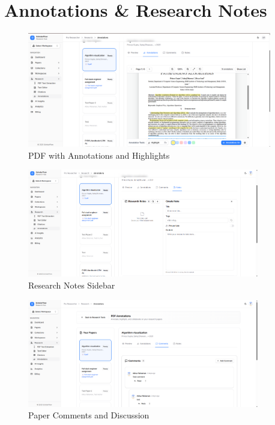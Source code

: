 \section{Annotations \& Research Notes}
\label{sec:screenshots-annotations}

\begin{figure}[H]
\centering
\includegraphics[width=0.95\textwidth]{images/screenshots/annotations.png}
\caption{PDF with Annotations and Highlights}
\label{fig:screenshot-annotations}
\end{figure}

\begin{figure}[H]
\centering
\includegraphics[width=0.9\textwidth]{images/screenshots/research_notes.png}
\caption{Research Notes Sidebar}
\label{fig:screenshot-research-notes}
\end{figure}

\begin{figure}[H]
\centering
\includegraphics[width=0.9\textwidth]{images/screenshots/paper_comments.png}
\caption{Paper Comments and Discussion}
\label{fig:screenshot-comments}
\end{figure}

